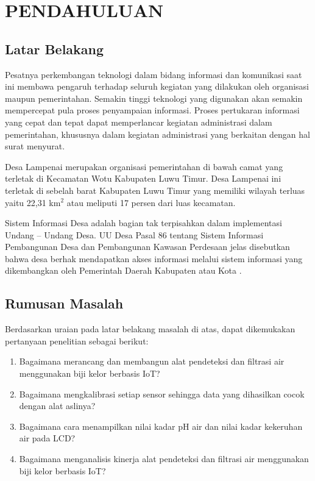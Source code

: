 \chapter{PENDAHULUAN}

\section{Latar Belakang}

Pesatnya perkembangan teknologi dalam bidang informasi dan komunikasi saat ini membawa pengaruh terhadap seluruh kegiatan yang dilakukan oleh organisasi maupun pemerintahan. Semakin tinggi teknologi yang digunakan akan semakin mempercepat pula proses penyampaian informasi. Proses pertukaran informasi yang cepat dan tepat dapat memperlancar kegiatan administrasi dalam pemerintahan, khususnya dalam kegiatan administrasi yang berkaitan dengan hal surat menyurat.

Desa Lampenai merupakan organisasi pemerintahan di bawah camat yang terletak di Kecamatan Wotu Kabupaten Luwu Timur. Desa Lampenai ini terletak di sebelah barat Kabupaten Luwu Timur yang memiliki wilayah terluas yaitu 22,31 km$^2$ atau meliputi 17 persen dari luas kecamatan.

Sistem Informasi Desa adalah bagian tak terpisahkan dalam implementasi Undang – Undang Desa. UU Desa Pasal 86 tentang Sistem Informasi Pembangunan Desa dan Pembangunan Kawasan Perdesaan jelas disebutkan bahwa desa berhak mendapatkan akses informasi melalui sistem informasi yang dikembangkan oleh Pemerintah Daerah Kabupaten atau Kota . 

\section{Rumusan Masalah}

Berdasarkan uraian pada latar belakang masalah di atas, dapat dikemukakan pertanyaan penelitian sebagai berikut:

\begin{enumerate}[topsep=0pt,itemsep=0pt,partopsep=0pt, parsep=0pt]
    \item Bagaimana merancang dan membangun alat pendeteksi dan filtrasi air menggunakan biji kelor berbasis IoT?
    \item Bagaimana mengkalibrasi setiap sensor sehingga data yang dihasilkan cocok dengan alat aslinya?
    \item Bagaimana cara menampilkan nilai kadar pH air dan nilai kadar kekeruhan air pada LCD?
    \item Bagaimana menganalisis kinerja alat pendeteksi dan filtrasi air menggunakan biji kelor berbasis IoT?
\end{enumerate}

